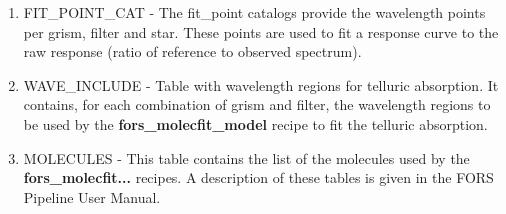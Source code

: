 \begin{enumerate}
\item FIT\_POINT\_CAT - The fit\_point catalogs provide the wavelength points per grism, filter and star. These points are used to fit a response curve to the raw response (ratio of reference to observed spectrum).

\item WAVE\_INCLUDE - Table with wavelength regions for telluric absorption. It contains, for each combination of grism and filter, the wavelength regions to be used by the {\bf fors\_molecfit\_model} recipe to fit the telluric absorption.

\item MOLECULES - This table contains the list of the molecules used by the {\bf fors\_molecfit...} recipes.
A description of these tables is given in the FORS Pipeline User Manual. 


    
\end{enumerate}
